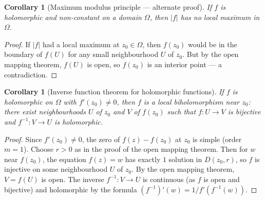 \documentclass[12pt,a4paper,openany]{book}
\theoremstyle{definition}
\theoremstyle{plain}
\newtheorem{corollary}[definition]{Corollary}
\theoremstyle{remark}
\newcommand{\abs}[1]{\left|#1\right|}
\begin{document}
\begin{corollary}[Maximum modulus principle — alternate proof]\label{cor:max-mod-open-map}
If $f$ is holomorphic and non-constant on a domain $\Omega$, then
$\abs{f}$ has no local maximum in $\Omega$.
\end{corollary}

\begin{proof}
If $\abs{f}$ had a local maximum at $z_0 \in \Omega$, then
$f(z_0)$ would be in the boundary of $f(U)$ for any small neighbourhood
$U$ of $z_0$. But by the open mapping theorem, $f(U)$ is open, so
$f(z_0)$ is an interior point — a contradiction.
\end{proof}

\begin{corollary}[Inverse function theorem for holomorphic functions]\label{cor:inverse-function}
If $f$ is holomorphic on $\Omega$ with $f'(z_0) \neq 0$, then $f$ is
a local biholomorphism near $z_0$: there exist neighbourhoods $U$ of $z_0$
and $V$ of $f(z_0)$ such that $f\colon U \to V$ is bijective and
$f^{-1}\colon V \to U$ is holomorphic.
\end{corollary}

\begin{proof}
Since $f'(z_0) \neq 0$, the zero of $f(z) - f(z_0)$ at $z_0$ is simple
(order $m=1$). Choose $r>0$ as in the proof of the open mapping theorem.
Then for $w$ near $f(z_0)$, the equation $f(z) = w$ has exactly $1$
solution in $D(z_0,r)$, so $f$ is injective on some neighbourhood $U$
of $z_0$. By the open mapping theorem, $V = f(U)$ is open. The inverse
$f^{-1}: V \to U$ is continuous (as $f$ is open and bijective) and
holomorphic by the formula $(f^{-1})'(w) = 1/f'(f^{-1}(w))$.
\end{proof}

\medskip

\begin{center}
\label{fig:open-mapping}
\end{center}
\end{document}
